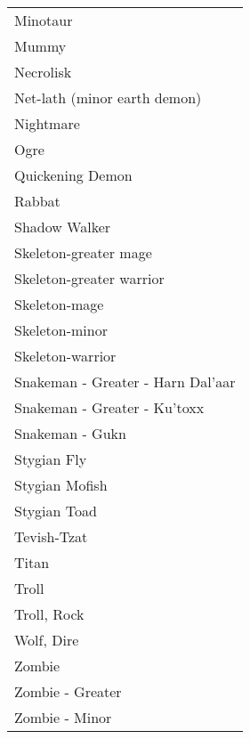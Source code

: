 \documentclass[twoside]{book}
\begin{document}
\begin{longtable}{p{1.25in}}
      \raggedright Minotaur\tabularnewline
      \raggedright Mummy\tabularnewline
      \raggedright Necrolisk\tabularnewline
      \raggedright Net-lath (minor earth demon)\tabularnewline
      \raggedright Nightmare\tabularnewline
      \raggedright Ogre\tabularnewline
      \raggedright Quickening Demon\tabularnewline
      \raggedright Rabbat\tabularnewline
      \raggedright Shadow Walker\tabularnewline
      \raggedright Skeleton-greater mage\tabularnewline
      \raggedright Skeleton-greater warrior\tabularnewline
      \raggedright Skeleton-mage\tabularnewline
      \raggedright Skeleton-minor\tabularnewline
      \raggedright Skeleton-warrior\tabularnewline
      \raggedright Snakeman - Greater - Harn Dal'aar\tabularnewline
      \raggedright Snakeman - Greater - Ku'toxx\tabularnewline
      \raggedright Snakeman - Gukn\tabularnewline
      \raggedright Stygian Fly\tabularnewline
      \raggedright Stygian Mofish\tabularnewline
      \raggedright Stygian Toad\tabularnewline
      \raggedright Tevish-Tzat\tabularnewline
      \raggedright Titan\tabularnewline
      \raggedright Troll\tabularnewline
      \raggedright Troll, Rock\tabularnewline
      \raggedright Wolf, Dire\tabularnewline
      \raggedright Zombie\tabularnewline
      \raggedright Zombie - Greater\tabularnewline
      \raggedright Zombie - Minor\tabularnewline
      
\end{longtable}
    
\end{document}
